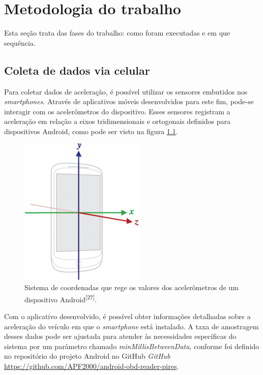 \chapter{Metodologia do trabalho}
\label{CAP3}

Esta seção trata das fases do trabalho: como foram  executadas e em que sequência.



\section{Coleta de dados via celular}
Para coletar dados de aceleração, é possível utilizar os sensores embutidos nos \textit{smartphones}. Através de aplicativos móveis desenvolvidos para este fim, pode-se interagir com os acelerômetros do dispositivo. Esses sensores registram a aceleração em relação a eixos tridimensionais e ortogonais definidos para dispositivos Android, como pode ser visto na figura \ref{fig:axis_android}.


\begin{figure}[hp]
    \centering
    
    \includegraphics[]{figures/axis_android_device.png}
    
    \caption{Sistema de coordenadas que rege os valores dos acelerômetros de um dispositivo Android\textsuperscript{[27]}.}
    
    \label{fig:axis_android}
\end{figure}

Com o aplicativo desenvolvido, é possível obter informações detalhadas sobre a aceleração do veículo em que o \textit{smartphone} está instalado. A taxa de amostragem desses dados pode ser ajustada para atender às necessidades específicas do sistema por um parâmetro chamado \textit{minMillisBetweenData}, conforme foi definido no repositório do projeto Android no GitHub \textit{GitHub} \url{https://github.com/APF2000/android-obd-reader-pires}. 

